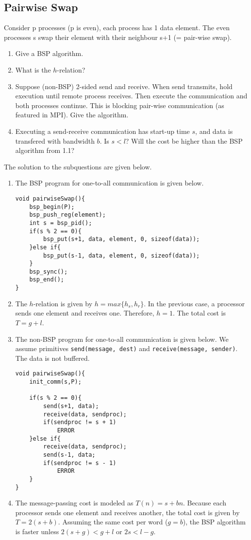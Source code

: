 \documentclass[../main.tex]{subfiles}
\begin{document}
\subsection{Pairwise Swap}
\begin{question}
Consider p processes (p is even), each process has 1 data element. The even processes s swap their element with their neighbour s+1 (= pair-wise swap).
\begin{enumerate}
	\item Give a BSP algorithm.
	\item What is the $h$-relation?
	\item Suppose (non-BSP) 2-sided send and receive. When send transmits, hold execution until remote process receives. Then execute the communication and both processes continue. This is blocking pair-wise communication (as featured in MPI). Give the algorithm.
	\item Executing a send-receive communication has start-up time $s$, and data is transfered with bandwidth $b$. Is $s < l$? Will the cost be higher than the BSP algorithm from 1.1?
\end{enumerate}
\end{question}
\begin{solution} The solution to the subquestions are given below.
\begin{enumerate}
	\item The BSP program for one-to-all communication is given below.
\begin{lstlisting}
void pairwiseSwap(){
	bsp_begin(P);
	bsp_push_reg(element);
	int s = bsp_pid();
	if(s % 2 == 0){
		bsp_put(s+1, data, element, 0, sizeof(data));
	}else if{
		bsp_put(s-1, data, element, 0, sizeof(data));
	}
	bsp_sync();
	bsp_end();
}
\end{lstlisting}
	\item The $h$-relation is given by $h = max\{h_s,h_r\}$. In the previous case, a processor sends one element and receives one. Therefore, $h = 1$. The total cost is $T = g + l$.
	\item The non-BSP program for one-to-all communication is given below. We assume primitives \texttt{send(message, dest)} and \texttt{receive(message, sender)}. The data is not buffered.
\begin{lstlisting}
void pairwiseSwap(){
	init_comm(s,P);

	if(s % 2 == 0){
		send(s+1, data);
		receive(data, sendproc);
		if(sendproc != s + 1)
			ERROR
	}else if{
		receive(data, sendproc);
		send(s-1, data;
		if(sendproc != s - 1)
			ERROR
	}
}
\end{lstlisting}
\item The message-passing cost is modeled as $T(n) = s + bn$. Because each processor sends one element and receives another, the total cost is given by $T = 2(s+b)$. Assuming the same cost per word ($g=b$), the BSP algorithm is faster unless $2(s+g) < g + l$ or $2s < l - g$.
\end{enumerate}
\end{solution}
\end{document}
